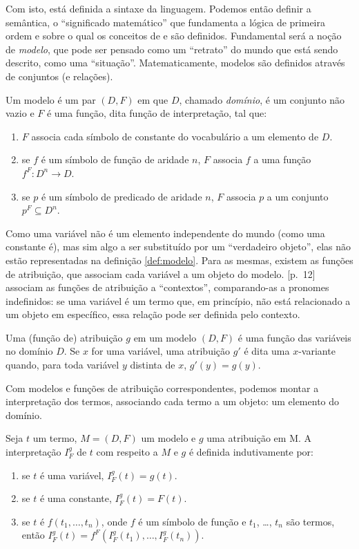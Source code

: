 Com isto, está definida a sintaxe da linguagem. Podemos então definir a semântica, o ``significado matemático'' que fundamenta a lógica de primeira ordem e sobre o qual os conceitos de  e  são definidos. Fundamental será a noção de \textit{modelo}, que pode ser pensado como um ``retrato'' do mundo que está sendo descrito, como uma ``situação''. Matematicamente, modelos são definidos através de conjuntos (e relações).

\begin{defn}[Modelo] \label{def:modelo}
Um modelo é um par $(D,F)$ em que $D$, chamado \textit{domínio}, é um conjunto não vazio e $F$ é uma função, dita função de interpretação, tal que:
\begin{enumerate}
\item $F$ associa cada símbolo de constante do vocabulário a um elemento de $D$.
\item se $f$ é um símbolo de função de aridade $n$, $F$ associa $f$ a uma função $f^{F}: D^{n} \rightarrow D$.
\item se $p$ é um símbolo de predicado de aridade $n$, $F$ associa $p$ a um conjunto $p^{F} \subseteq D^{n}$.
\end{enumerate}
\end{defn}

Como uma variável não é um elemento independente do mundo (como uma constante é), mas sim algo a ser substituído por um ``verdadeiro objeto'', elas não estão representadas na definição \ref{def:modelo}. Para as mesmas, existem as funções de atribuição, que associam cada variável a um objeto do modelo. \citet{BlackburnBos:2005}[p.~12] associam as funções de atribuição a ``contextos'', comparando-as a pronomes indefinidos: se uma variável é um termo que, em princípio, não está relacionado a um objeto em específico, essa relação pode ser definida pelo contexto.

\begin{defn}[Atribuição]
Uma (função de) atribuição $g$ em um modelo $(D,F)$ é uma função das variáveis no domínio $D$. Se $x$ for uma variável, uma atribuição $g'$ é dita uma $x$-variante quando, para toda variável $y$ distinta de $x$, $g'(y) = g(y)$.
\end{defn}

Com modelos e funções de atribuição correspondentes, podemos montar a interpretação dos termos, associando cada termo a um objeto: um elemento do domínio. 

\begin{defn}[Interpretação]
Seja $t$ um termo, $M = (D,F)$ um modelo e $g$ uma atribuição em M. A interpretação $I_F^g$ de $t$ com respeito a $M$ e $g$ é definida indutivamente por:
\begin{enumerate}
\item se $t$ é uma variável, $I_F^g(t) = g(t)$.
\item se $t$ é uma constante, $I_F^g(t) = F(t)$.
\item se $t$ é $f(t_1,\dots,t_n)$, onde $f$ é um símbolo de função e $t_1$, \dots, $t_n$ são termos, então $I_F^g(t) = f^{F}(I_F^g(t_1), \dots, I_F^g(t_n))$.
\end{enumerate}
\end{defn}

